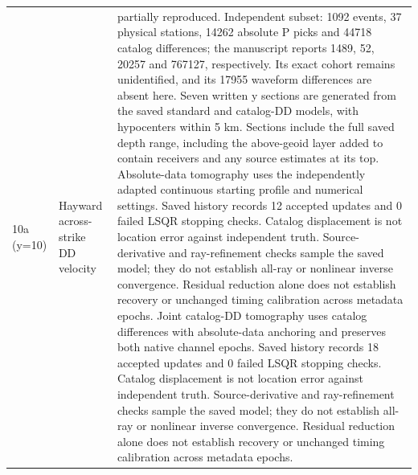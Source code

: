\begin{longtable}{>{\raggedright\arraybackslash}p{}>{\raggedright\arraybackslash}p{}>{\raggedright\arraybackslash}p{}}
10a (y=10) & Hayward across-strike DD velocity & partially reproduced. Independent subset: 1092 events, 37 physical stations, 14262 absolute P picks and 44718 catalog differences; the manuscript reports 1489, 52, 20257 and 767127, respectively. Its exact cohort remains unidentified, and its 17955 waveform differences are absent here. Seven written y sections are generated from the saved standard and catalog-DD models, with hypocenters within 5 km. Sections include the full saved depth range, including the above-geoid layer added to contain receivers and any source estimates at its top. Absolute-data tomography uses the independently adapted continuous starting profile and numerical settings. Saved history records 12 accepted updates and 0 failed LSQR stopping checks. Catalog displacement is not location error against independent truth. Source-derivative and ray-refinement checks sample the saved model; they do not establish all-ray or nonlinear inverse convergence. Residual reduction alone does not establish recovery or unchanged timing calibration across metadata epochs. Joint catalog-DD tomography uses catalog differences with absolute-data anchoring and preserves both native channel epochs. Saved history records 18 accepted updates and 0 failed LSQR stopping checks. Catalog displacement is not location error against independent truth. Source-derivative and ray-refinement checks sample the saved model; they do not establish all-ray or nonlinear inverse convergence. Residual reduction alone does not establish recovery or unchanged timing calibration across metadata epochs.\\

\end{longtable}
